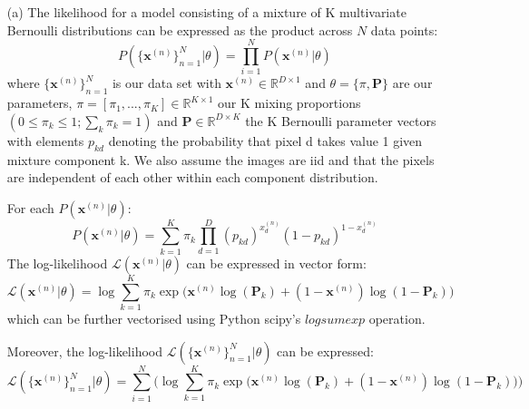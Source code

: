 \documentclass[12pt]{article}
\begin{document}
\begin{enumerate}

%
%

\item[(a)] The likelihood for a model consisting of a mixture of K multivariate Bernoulli distributions can be expressed as the product across $N$ data points:
$$P(\{\textbf{x}^{(n)}\}_{n=1}^{N}|\theta) = \prod_{i=1}^{N}P(\textbf{x}^{(n)}|\theta)$$
where $\{\textbf{x}^{(n)}\}_{n=1}^{N}$ is our data set with $\textbf{x}^{(n)} \in \mathbb{R}^{D \times 1}$ and $\theta = \{\pi, \mathbf{P}\}$ are our parameters, $\pi = [\pi_1, . . . , \pi_K] \in \mathbb{R}^{K \times 1}$ our K mixing proportions $(0 \leq \pi_k \leq 1; \sum_k \pi_k = 1)$ and $\mathbf{P} \in \mathbb{R}^{D \times K}$ the K Bernoulli parameter vectors with elements $p_{kd}$ denoting the probability that pixel d takes value 1 given mixture component k. We also assume the images are iid and that the pixels are independent of each other within each component distribution.

For each $P(\textbf{x}^{(n)}|\theta)$:
$$P(\textbf{x}^{(n)}|\theta) = \sum_{k=1}^{K} \pi_k \prod_{d=1}^D (p_{kd})^{x^{(n)}_{d}} (1-p_{kd})^{1-x^{(n)}_{d}}$$
The log-likelihood $\mathcal{L}(\textbf{x}^{(n)}|\theta)$ can be expressed in vector form:
$$\mathcal{L}(\textbf{x}^{(n)}|\theta) = \log \sum_{k=1}^{K}  \pi_k \exp\bigg(\textbf{x}^{(n)}\log(\mathbf{P}_{k}) + (1-\textbf{x}^{(n)})\log(1-\mathbf{P}_{k})\bigg) $$
which can be further vectorised using Python scipy's $logsumexp$ operation.

Moreover, the log-likelihood $\mathcal{L}(\{\textbf{x}^{(n)}\}_{n=1}^{N}|\theta)$ can be expressed:
$$\mathcal{L}(\{\textbf{x}^{(n)}\}_{n=1}^{N}|\theta) = \sum_{i=1}^{N} \Bigg( \log \sum_{k=1}^{K}  \pi_k \exp\bigg(\textbf{x}^{(n)}\log(\mathbf{P}_{k}) + (1-\textbf{x}^{(n)})\log(1-\mathbf{P}_{k})\bigg) \Bigg)$$


\end{enumerate}
\end{document}
